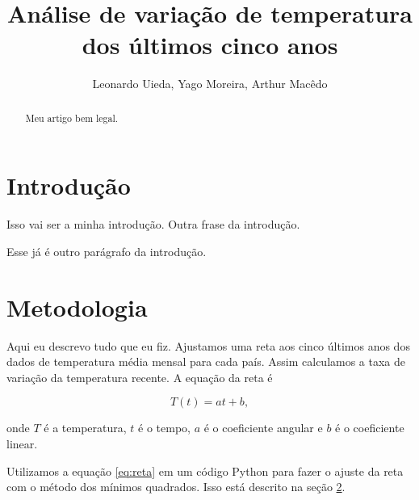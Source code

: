 \documentclass{article}
\begin{document}
\title{Análise de variação de temperatura dos últimos cinco anos}
\author{Leonardo Uieda, Yago Moreira, Arthur Macêdo}

\maketitle

\begin{abstract}
Meu artigo bem legal.
\end{abstract}

\section{Introdução}

Isso vai ser a minha introdução.
Outra frase da introdução.

Esse já é outro parágrafo da introdução.

\section{Metodologia}
\label{sec:metodos}

Aqui eu descrevo tudo que eu fiz.
Ajustamos uma reta aos cinco últimos anos dos dados de temperatura média mensal para cada país.
Assim calculamos a taxa de variação da temperatura recente.
A equação da reta é

\begin{equation}
T(t) = a t + b,
\label{eq:reta}
\end{equation}

\noindent
onde $T$ é a temperatura, $t$ é o tempo, $a$ é o coeficiente angular e $b$ é o coeficiente linear.

Utilizamos a equação \ref{eq:reta} em um código Python para fazer o ajuste da reta com o método dos mínimos quadrados.
Isso está descrito na seção \ref{sec:metodos}.
\end{document}

